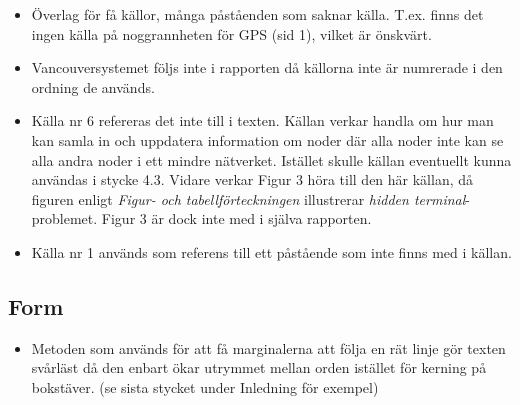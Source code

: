 \documentclass[a4paper,11pt]{article}
\begin{document}
\begin{itemize}
   \item Överlag för få källor, många påståenden som saknar källa. T.ex. finns det ingen källa på noggrannheten för GPS (sid 1), vilket är önskvärt.
   \item Vancouversystemet följs inte i rapporten då källorna inte är numrerade i den ordning de används.
   \item Källa nr 6 refereras det inte till i texten. Källan verkar handla om hur man kan samla in och uppdatera information om noder där alla noder inte kan se alla andra noder i ett mindre nätverket. Istället skulle källan eventuellt kunna användas i stycke 4.3. Vidare verkar Figur 3 höra till den här källan, då figuren enligt \emph{Figur- och tabellförteckningen} illustrerar \emph{hidden terminal}-problemet. Figur 3 är dock inte med i själva rapporten.
   \item Källa nr 1 används som referens till ett påstående som inte finns med i källan.
\end{itemize}

\subsection{Form}

\begin{itemize}
   \item Metoden som används för att få marginalerna att följa en rät linje gör texten svårläst då den enbart ökar utrymmet mellan orden istället för kerning på bokstäver. (se sista stycket under Inledning för exempel)
\end{itemize}
\end{document}
